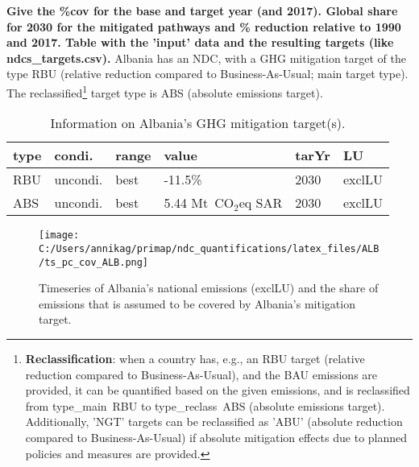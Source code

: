 \documentclass[12pt]{article}
\begin{document}
 \textbf{ 
 Give the \%cov for the base and target year (and 2017).
 Global share for 2030 for the mitigated pathways and \% reduction relative to 1990 and 2017.
 Table with the 'input' data and the resulting targets (like ndcs\_targets.csv).}
 Albania has an NDC, with a GHG mitigation target of the type RBU (relative reduction compared to Business-As-Usual; main target type).
 The reclassified\footnote{\textbf{Reclassification}: when a country has, e.g., an RBU target (relative reduction compared to Business-As-Usual), and the BAU emissions are provided, it can be quantified based on the given emissions, and is reclassified from type\_main~RBU to type\_reclass~ABS (absolute emissions target).
 Additionally, 'NGT' targets can be reclassified as 'ABU' (absolute reduction compared to Business-As-Usual) if absolute mitigation effects due to planned policies and measures are provided.}  target type is ABS (absolute emissions target).
 \begin{table}[htbp]
 \centering
 \caption{Information on Albania's GHG mitigation target(s).}
 \label{tab:mitiTars}
 \begin{tabular}{l l l l l l }
 \bfseries type & \bfseries condi. & \bfseries range & \bfseries value & \bfseries tarYr & \bfseries LU \tabularnewline \hline
 RBU & uncondi. & best & -11.5\% & 2030 & exclLU \tabularnewline 
 ABS & uncondi. & best & 5.44 Mt~CO$_2$eq SAR & 2030 & exclLU \tabularnewline 
 \end{tabular}
 \end{table}
 \begin{figure}[htbp]
 \centering
 \texttt{[image: C:/Users/annikag/primap/ndc\_quantifications/latex\_files/ALB/ts\_pc\_cov\_ALB.png]}
 \caption{Timeseries of Albania's national emissions (exclLU) and the share of emissions that is assumed to be covered by Albania's mitigation target.}
 \label{fig:tsPcCov}
 \end{figure}
\end{document}
